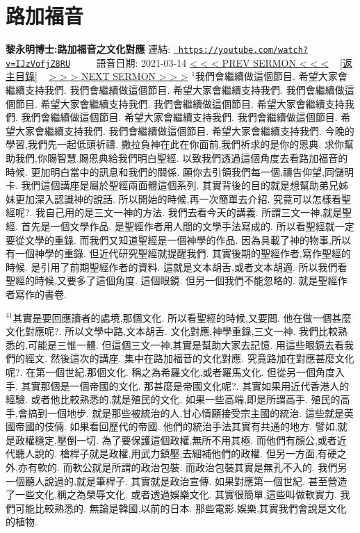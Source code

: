 \documentclass{book}
\begin{document}
\section{路加福音}
\label{sec:IJzVofjZ8RU}
\textbf{黎永明博士:路加福音之文化對應}
\newline
\newline
連結: \href{https://youtube.com/watch?v=IJzVofjZ8RU}{\texttt{ https://youtube.com/watch?v=IJzVofjZ8RU}} ~~~~ 語音日期: 2021-03-14 
\newline
\newline
\hyperref[sec:AHag0CgcAJk]{\small{< < < PREV SERMON < < <}}
~
\hyperref[sec:index]{\small{[返主目錄]}}
~
\hyperref[sec:XC_bvKu337s]{\small{> > > NEXT SERMON > > >}}
\newline
\newline
$^{1}$我們會繼續做這個節目.
希望大家會繼續支持我們.
我們會繼續做這個節目.
希望大家會繼續支持我們.
我們會繼續做這個節目.
希望大家會繼續支持我們.
我們會繼續做這個節目.
希望大家會繼續支持我們.
我們會繼續做這個節目.
希望大家會繼續支持我們.
我們會繼續做這個節目.
希望大家會繼續支持我們.
我們會繼續做這個節目.
希望大家會繼續支持我們.
今晚的學習,我們先一起低頭祈禱.
撒拉負神在此在你面前,我們祈求的是你的恩典.
求你幫助我們,你賜智慧,賜恩典給我們明白聖經.
以致我們透過這個角度去看路加福音的時候.
更加明白當中的訊息和我們的關係.
願你去引領我們每一個,禱告仰望,同儲明卡.
我們這個講座是屬於聖經兩面體這個系列.
其實背後的目的就是想幫助弟兄姊妹更加深入認識神的說話.
所以開始的時候,再一次簡單去介紹.
究竟可以怎樣看聖經呢?.
我自己用的是三文一神的方法.
我們去看今天的講義.
所謂三文一神,就是聖經.
首先是一個文學作品.
是聖經作者用人間的文學手法寫成的.
所以看聖經就一定要從文學的重錄.
而我們又知道聖經是一個神學的作品.
因為具載了神的物事,所以有一個神學的重錄.
但近代研究聖經就提醒我們.
其實後期的聖經作者,寫作聖經的時候.
是引用了前期聖經作者的資料.
這就是文本胡舌,或者文本胡適.
所以我們看聖經的時候,又要多了這個角度.
這個眼鏡.
但另一個我們不能忽略的.
就是聖經作者寫作的書卷.

$^{41}$其實是要回應讀者的處境,那個文化.
所以看聖經的時候,又要問.
他在做一個甚麼文化對應呢?.
所以文學中路,文本胡舌.
文化對應,神學重錄,三文一神.
我們比較熟悉的,可能是三惟一體.
但這個三文一神,其實是幫助大家去記憶.
用這些眼鏡去看我們的經文.
然後這次的講座.
集中在路加福音的文化對應.
究竟路加在對應甚麼文化呢?.
在第一個世紀,那個文化.
稱之為希羅文化,或者羅馬文化.
但從另一個角度入手.
其實那個是一個帝國的文化.
那甚麼是帝國文化呢?.
其實如果用近代香港人的經驗.
或者他比較熟悉的,就是殖民的文化.
如果一些高端,即是所謂高手.
殖民的高手,會搞到一個地步.
就是那些被統治的人,甘心情願接受宗主國的統治.
這些就是英國帝國的伎倆.
如果看回歷代的帝國.
他們的統治手法其實有共通的地方.
譬如,就是政權穩定,壓倒一切.
為了要保護這個政權,無所不用其極.
而他們有顏公,或者近代聽人說的.
槍桿子就是政權,用武力鎮壓,去細補他們的政權.
但另一方面,有硬之外,亦有軟的.
而軟公就是所謂的政治包裝.
而政治包裝其實是無孔不入的.
我們另一個聽人說過的,就是筆桿子.
其實就是政治宣傳.
如果對應第一個世紀.
甚至營造了一些文化,稱之為榮辱文化.
或者透過娛樂文化.
其實很簡單,這些叫做軟實力.
我們可能比較熟悉的.
無論是韓國,以前的日本.
那些電影,娛樂,其實我們會說是文化的植物.
\end{document}
